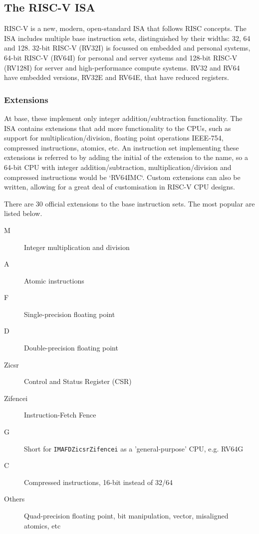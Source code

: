 \subsection{The RISC-V ISA}
RISC-V is a new, modern, open-standard ISA that follows RISC concepts. The ISA includes multiple base instruction sets, distinguished by their widths: 32, 64 and 128. 32-bit RISC-V (RV32I) is focussed on embedded and personal systems, 64-bit RISC-V (RV64I) for personal and server systems and 128-bit RISC-V (RV128I) for server and high-performance compute systems. RV32 and RV64 have embedded versions, RV32E and RV64E, that have reduced registers\cite{riscv-1}.

\subsubsection{Extensions}
At base, these implement only integer addition/subtraction functionality. The ISA contains extensions that add more functionality to the CPUs, such as support for multiplication/division, floating point operations IEEE-754, compressed instructions, atomics, etc. An instruction set implementing these extensions is referred to by adding the initial of the extension to the name, so a 64-bit CPU with integer addition/subtraction, multiplication/division and compressed instructions would be `RV64IMC`. Custom extensions can also be written, allowing for a great deal of customisation in RISC-V CPU designs\cite{riscv-1}.

There are 30 official extensions to the base instruction sets. The most popular are listed below.
\begin{description}
    \item[M] Integer multiplication and division
    \item[A] Atomic instructions
    \item[F] Single-precision floating point
    \item[D] Double-precision floating point
    \item[Zicsr] Control and Status Register (CSR)
    \item[Zifencei] Instruction-Fetch Fence
    \item[G] Short for \texttt{IMAFDZicsrZifencei} as a 'general-purpose' CPU, e.g. RV64G
    \item[C] Compressed instructions, 16-bit instead of 32/64
    \item[Others] Quad-precision floating point, bit manipulation, vector, misaligned atomics, etc
\end{description}

